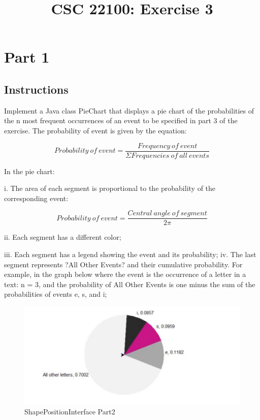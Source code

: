 \documentclass[a4paper,12pt]{article}
\title{CSC 22100: Exercise 3}
\begin{document}
\newpage
\maketitle
\tableofcontents

\pagebreak
\listoffigures

\newpage


\section{Part 1}

\subsection{Instructions}
Implement a Java class PieChart that displays a pie chart of the probabilities of the n most frequent occurrences of an event to be specified in part 3 of the exercise. The probability of event is given by the equation:


\begin{equation} \label{ProbabilityEquation}
Probability \ of \ event = \frac{Frequency \ of  \ event}{\Sigma Frequencies  \ of \ all \ events}
\end{equation}


In the pie chart: \newline

i. The area of each segment is proportional to the probability of the corresponding event:

\begin{equation}  \label{equationForAngles}
Probability \ of \ event = \frac{Central \ angle \ of \ segment}{2 \pi }
\end{equation}



ii. Each segment has a different color;	

iii. Each segment has a legend showing the event and its probability; \newline
iv. The last segment represents ?All Other Events? and their cumulative
probability. For example, in the graph below where the event is the occurrence of a letter in a text: n = 3, and the probability of All Other Events is one minus the sum of the probabilities of events e, s, and i;

\begin{figure}[H]
   \centering
   \includegraphics[width = 17cm]{pieChartExample} %
   \caption{ShapePositionInterface Part2}
   \label{ShapePositionInterface Part2}
\end{figure}
\end{document}
